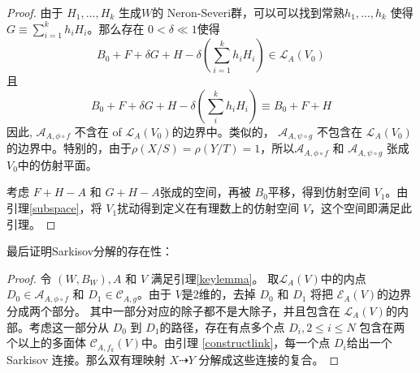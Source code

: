 \begin{proof}
  由于 $H_{1},\ldots ,H_{k}$ 生成$W$的 Neron-Severi群，可以可以找到常熟$h_{1},\ldots ,h_{k}$ 使得 $G \equiv \sum^{k}_{i=1} h_{i}H_{i}$。那么存在 $0< \delta\ll 1$使得 
  \[B_{0}+F+\delta G+H- \delta(\sum_{i=1}^{k} h_{i}H_{i}) \in \mathcal{L}_{A}(V_{0})\]
  且
  \[ B_{0}+F+\delta G+H-\delta (\sum_i^k h_{i}H_{i}) \equiv B_{0}+F+H \]
  因此, $\mathcal{A}_{A,\phi\circ f}$ 不含在 of $\mathcal{L}_{A}(V_{0})$的边界中。类似的， $\mathcal{A}_{A,\psi\circ g}$ 不包含在 $\mathcal{L}_{A}(V_{0})$的边界中。特别的，由于$\rho(X/S)=\rho(Y/T)=1$，所以$\mathcal{A}_{A,\phi\circ f}$ 和   $\mathcal{A}_{A,\psi\circ g}$ 张成 $V_{0}$中的仿射平面。

  考虑 $F+H-A$ 和 $G+H-A$张成的空间，再被 $B_{0}$平移，得到仿射空间 $V_{1}$。由引理\ref{subspace}，将 $V_{1}$扰动得到定义在有理数上的仿射空间 $V$，这个空间即满足此引理。
\end{proof}

最后证明Sarkisov分解的存在性：
\begin{proof}
  令 $(W,B_{W}),A $ 和 $V$ 满足引理\ref{keylemma}。 取$ \mathcal{L}_A(V) $中的内点$ D_{0} \in \mathcal{A}_{A,\phi\circ f} $  和 $ D_1\in \mathcal{C}_{A,g} $。由于 $ V $是2维的，去掉 $ D_0 $ 和 $ D_1 $ 将把 $ \mathcal{E}_A(V) $的边界分成两个部分。
  其中一部分对应的除子都不是大除子，并且包含在 $ \mathcal{L}_A(V) $的内部。考虑这一部分从 $ D_0 $ 到 $ D_1 $的路径，存在有点多个点 $ D_i , 2\leqslant i\leqslant N $ 包含在两个以上的多面体 $ \mathcal{C}_{A,f_{k}}(V) $中。由引理 \ref{constructlink}，每一个点 $ D_i $给出一个 Sarkisov 连接。那么双有理映射 $X \dashrightarrow Y$ 分解成这些连接的复合。
\end{proof}
